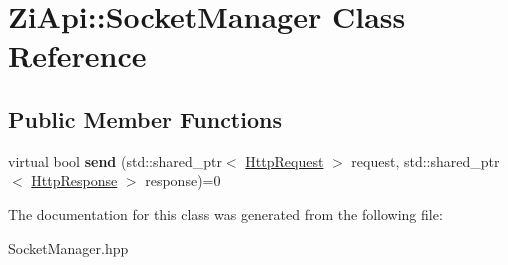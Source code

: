 \hypertarget{classZiApi_1_1SocketManager}{}\section{Zi\+Api\+::Socket\+Manager Class Reference}
\label{classZiApi_1_1SocketManager}
\subsection*{Public Member Functions}
\begin{DoxyCompactItemize}
\item 
\mbox{\label{classZiApi_1_1SocketManager_a783ad4cfda9f8927a5f5b138c4b7d8f1}} 
virtual bool {\bfseries send} (std\+::shared\+\_\+ptr$<$ \mbox{\hyperlink{classZiApi_1_1HttpRequest}{Http\+Request}} $>$ request, std\+::shared\+\_\+ptr$<$ \mbox{\hyperlink{classZiApi_1_1HttpResponse}{Http\+Response}} $>$ response)=0
\end{DoxyCompactItemize}


The documentation for this class was generated from the following file\+:\begin{DoxyCompactItemize}
\item 
Socket\+Manager.\+hpp\end{DoxyCompactItemize}
